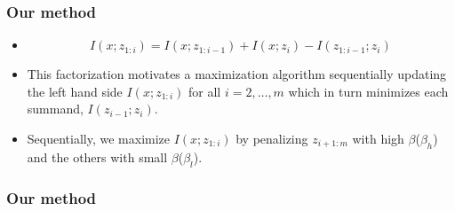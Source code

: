 \documentclass[10pt,mathserif]{beamer}
\begin{document}
\begin{frame}
\frametitle{Our method}
\begin{itemize}\itemsep=20pt
\item 
\[I(x;z_{1:i}) = I(x;z_{1:i-1}) + I(x;z_{i}) - I(z_{1:i-1};z_{i})\]
\item This factorization motivates a maximization algorithm sequentially updating the left hand side $I(x; z_{1:i})$ for all $i=2,\ldots,m$ which in turn minimizes each summand, $I(z_{i-1};z_i)$.\pause
\item Sequentially, we maximize $I(x;z_{1:i})$ by penalizing $z_{i+1:m}$ with high $\beta$($\beta_h$) and the others with small $\beta$($\beta_l$).
\end{itemize}
\end{frame}

\begin{frame}
\frametitle{Our method}
\begin{figure}
%
%
%

\end{figure}
\end{frame}
\end{document}
